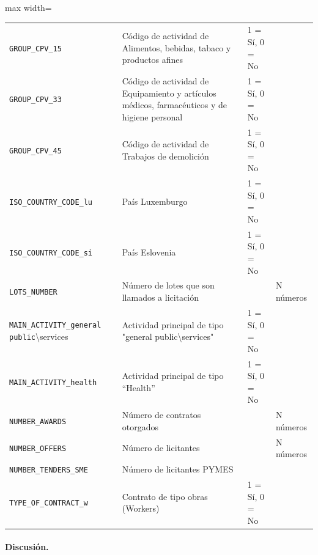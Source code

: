 \documentclass[a4paper,fleqn]{cas-sc}
\begin{document}
\begin{table}[t]
\begin{adjustbox}{max width=\textwidth}
\begin{tabular}{p{3.5cm}p{5.75cm}ll}
				\texttt{GROUP\_CPV\_15}           & Código de actividad de Alimentos, bebidas, tabaco y productos afines & 1 = Sí, 0 = No & \\ %
				\texttt{GROUP\_CPV\_33}           & Código de actividad de Equipamiento y artículos médicos, farmacéuticos y de higiene personal & 1 = Sí, 0 = No & \\ %
				\texttt{GROUP\_CPV\_45}           & Código de actividad de Trabajos de demolición & 1 = Sí, 0 = No & \\ %
				\texttt{ISO\_COUNTRY\_CODE\_lu}   & País Luxemburgo                                                   & 1 = Sí, 0 = No          &                            \\ %
				\texttt{ISO\_COUNTRY\_CODE\_si}   & País Eslovenia & 1 = Sí, 0 = No & \\ %
				\texttt{LOTS\_NUMBER}             & Número de lotes que son llamados a licitación                     &                         & N números                  \\ %
				\texttt{MAIN\_ACTIVITY\_general public}\textbackslash{}services & Actividad principal de tipo "general public\textbackslash{}services"                    & 1 = Sí, 0 = No &  \\ %
				\texttt{MAIN\_ACTIVITY\_health}   & Actividad principal de tipo ``Health'' & 1 = Sí, 0 = No & \\ %
				\texttt{NUMBER\_AWARDS}           & Número de contratos otorgados                                     &                         & N números                  \\ %
				\texttt{NUMBER\_OFFERS}           & Número de licitantes                                              &                         & N números                  \\ %
				\texttt{NUMBER\_TENDERS\_SME}     & Número de licitantes PYMES                                        &                         &                            \\ %
				\texttt{TYPE\_OF\_CONTRACT\_w}    & Contrato de tipo obras (Workers) & 1 = Sí, 0 = No & \\ %
				\hline
			\end{tabular}
		\end{adjustbox}	
		
	\end{table}

\paragraph{\textbf{Discusión.}}
\end{document}
